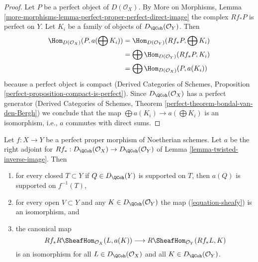 \begin{proof}
Let $P$ be a perfect object of $D(\mathcal{O}_X)$. By
More on Morphisms, Lemma
\ref{more-morphisms-lemma-perfect-proper-perfect-direct-image}
the complex $Rf_*P$ is perfect on $Y$.
Let $K_i$ be a family of objects of $D_\QCoh(\mathcal{O}_Y)$.
Then
\begin{align*}
\Hom_{D(\mathcal{O}_X)}(P, a(\bigoplus K_i))
& =
\Hom_{D(\mathcal{O}_Y)}(Rf_*P, \bigoplus K_i) \\
& =
\bigoplus \Hom_{D(\mathcal{O}_Y)}(Rf_*P, K_i) \\
& =
\bigoplus \Hom_{D(\mathcal{O}_X)}(P, a(K_i))
\end{align*}
because a perfect object is compact (Derived Categories of Schemes,
Proposition \ref{perfect-proposition-compact-is-perfect}).
Since $D_\QCoh(\mathcal{O}_X)$ has a perfect generator
(Derived Categories of Schemes, Theorem
\ref{perfect-theorem-bondal-van-den-Bergh})
we conclude that the map $\bigoplus a(K_i) \to a(\bigoplus K_i)$
is an isomorphism, i.e., $a$ commutes with direct sums.
\end{proof}

\begin{lemma}
\label{lemma-proper-flat-noetherian-relative}
Let $f : X \to Y$ be a perfect proper morphism of Noetherian schemes.
Let $a$ be the right adjoint for
$Rf_* : D_\QCoh(\mathcal{O}_X) \to D_\QCoh(\mathcal{O}_Y)$ of
Lemma \ref{lemma-twisted-inverse-image}. Then
\begin{enumerate}
\item for every closed $T \subset Y$ if $Q \in D_\QCoh(Y)$ is supported on $T$,
then $a(Q)$ is supported on $f^{-1}(T)$,
\item for every open $V \subset Y$ and any $K \in D_\QCoh(\mathcal{O}_Y)$
the map (\ref{equation-sheafy}) is an isomorphism, and
\item the canonical map
$$
Rf_*R\SheafHom_{\mathcal{O}_X}(L, a(K))
\longrightarrow
R\SheafHom_{\mathcal{O}_Y}(Rf_*L, K)
$$
is an isomorphism for all $L \in D_\QCoh(\mathcal{O}_X)$ and all
$K \in D_\QCoh(\mathcal{O}_Y)$.
\end{enumerate}
\end{lemma}

